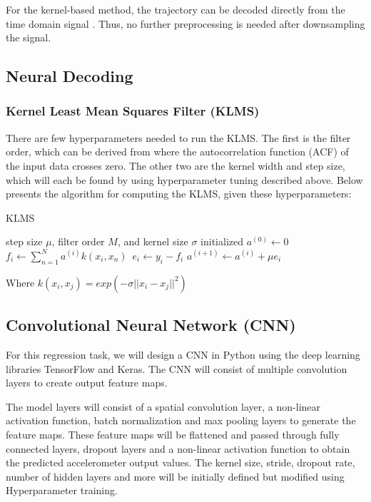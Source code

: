 \documentclass[12pt]{article}
\begin{document}
For the kernel-based method, the trajectory can be decoded directly from the time domain signal \cite{li2012}. Thus, no further preprocessing is needed after downsampling the signal.

\subsection{Neural Decoding}

\subsubsection{Kernel Least Mean Squares Filter (KLMS)}

There are few hyperparameters needed to run the KLMS. The first is the filter order, which can be derived from where the autocorrelation function (ACF) of the input data crosses zero. The other two are the kernel width and step size, which will each be found by using hyperparameter tuning described above. Below presents the algorithm for computing the KLMS, given these hyperparameters:

\begin{algorithm}
\caption{KLMS}\label{alg:cap}
\begin{algorithmic}
   \Require step size $\mu$, filter order $M$, and kernel size $\sigma$ initialized   
   \State $a^{(0)} \gets 0$  
     \State $f_i \gets \sum_{n=1}^{N} a^{(i)} k(x_i, x_n)$\   
     \State $e_i \gets y_i - f_i$    
     \State $a^{(i+1)} \gets a^{(i)} + \mu e_i$   
   \EndFor 
\end{algorithmic}
\end{algorithm}

Where $k(x_i, x_j) = exp(-\sigma || x_i - x_j ||^2)$

\subsection{Convolutional Neural Network (CNN)}

For this regression task, we will design a CNN in Python using the deep learning libraries TensorFlow and Keras. The CNN will consist of multiple convolution layers to create output feature maps. \cite{Angrick2019}

The model layers will consist of a spatial convolution layer, a non-linear activation function, batch normalization and max pooling layers to generate the feature maps. These feature maps will be flattened and passed through fully connected layers, dropout layers and a non-linear activation function to obtain the predicted accelerometer output values. The kernel size, stride, dropout rate, number of hidden layers and more will be initially defined but modified using Hyperparameter training.
\end{document}
